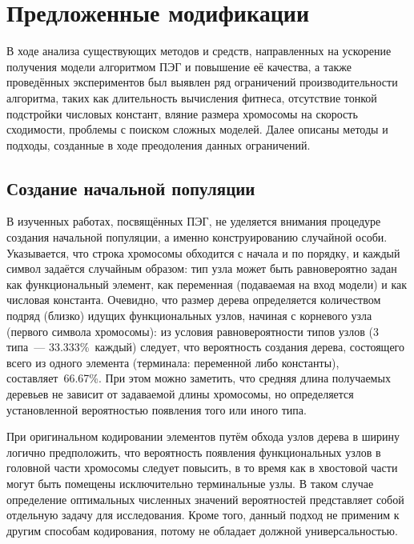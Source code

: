 \section{Предложенные модификации}

В ходе анализа существующих методов и средств, направленных на ускорение получения модели алгоритмом ПЭГ и повышение её качества, а также проведённых экспериментов был выявлен ряд ограничений производительности алгоритма, таких как длительность вычисления фитнеса, отсутствие тонкой подстройки числовых констант, вляние размера хромосомы на скорость сходимости, проблемы с поиском сложных моделей. Далее описаны методы и подходы, созданные в ходе преодоления данных ограничений.


\subsection{Создание начальной популяции}

В изученных работах, посвящённых ПЭГ, не уделяется внимания процедуре создания начальной популяции, а именно конструированию случайной особи. Указывается, что строка хромосомы обходится с начала и по порядку, и каждый символ задаётся случайным образом: тип узла может быть равновероятно задан как функциональный элемент, как переменная (подаваемая на вход модели) и как числовая константа. Очевидно, что размер дерева определяется количеством подряд (близко) идущих функциональных узлов, начиная с корневого узла (первого символа хромосомы): из условия равновероятности типов узлов (3 типа~--- 33.333\%~каждый) следует, что вероятность создания дерева, состоящего всего из одного элемента (терминала: переменной либо константы), составляет~66.67\%. При этом можно заметить, что средняя длина получаемых деревьев не зависит от задаваемой длины хромосомы, но определяется установленной вероятностью появления того или иного типа.

При оригинальном кодировании элементов путём обхода узлов дерева в ширину логично предположить, что вероятность появления функциональных узлов в головной части хромосомы следует повысить, в то время как в хвостовой части могут быть помещены исключительно терминальные узлы. В таком случае определение оптимальных численных значений вероятностей представляет собой отдельную задачу для исследования. Кроме того, данный подход не применим к другим способам кодирования, потому не обладает должной универсальностью.

